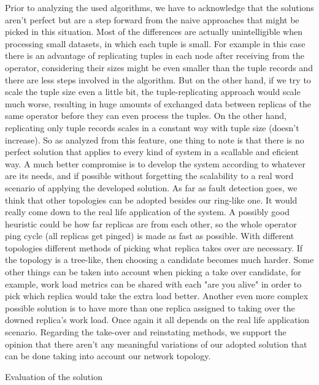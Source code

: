 \documentclass[times, 10pt,twocolumn]{article}
\begin{document}
Prior to analyzing the used algorithms, we have to acknowledge that the
solutions aren't perfect but are a step forward from the naive approaches
that might be picked in this situation. Most of the differences are
actually unintelligible when processing small datasets, in which each
tuple is small.  For example in this case there is an advantage of
replicating tuples in each node after receiving from the operator,
considering their sizes might be even smaller than the tuple records and
there are less steps involved in the algorithm. But on the other hand, if
we try to scale the tuple size even a little bit, the
tuple-replicating approach would scale much worse, resulting in huge
amounts of exchanged data between replicas of the same operator before
they can even process the tuples. On the other hand, replicating only
tuple records scales in a constant way with tuple size (doesn't increase).
So as analyzed from this feature, one thing to note is that there is no
perfect solution that applies to every kind of system in a scallable and
eficient way.  A much better compromise is to develop the system according
to whatever are its needs, and if possible without forgetting the
scalability to a real word scenario of applying the developed solution.
As far as fault detection goes, we think that other topologies can be adopted besides our ring-like one. It would really come down to the real life application of the system. A possibly good heuristic could be how far replicas are from each other, so the whole operator ping cycle (all replicas get pinged) is made as fast as possible. With different topologies different methods of picking what replica takes over are necessary. If the topology is a tree-like, then choosing a candidate becomes much harder. Some other things can be taken into account when picking a take over candidate, for example, work load metrics can be shared with each "are you alive" in order to pick which replica would take the extra load better. Another even more complex possible solution is to have more than one replica assigned to taking over the downed replica's work load. Once again it all depends on the real life application scenario.
Regarding the take-over and reinstating methods, we support the opinion that there aren't any meaningful variations of our adopted solution that can be done taking into account our network topology.


Evaluation of the solution
\end{document}
